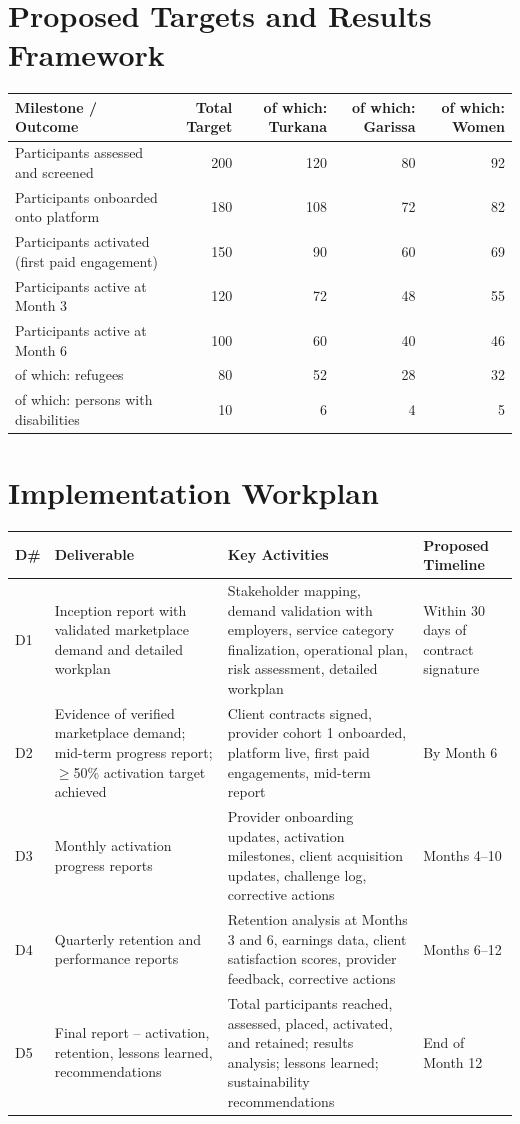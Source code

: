 \documentclass[11pt,a4paper]{article}
\begin{document}
\section{Proposed Targets and Results Framework}
\begin{longtable}{@{}lrrrr@{}}
\textbf{Milestone / Outcome} & \textbf{Total Target} & \textbf{of which: Turkana} & \textbf{of which: Garissa} & \textbf{of which: Women} \\
\hline
Participants assessed and screened & 200 & 120 & 80 & 92 \\
Participants onboarded onto platform & 180 & 108 & 72 & 82 \\
Participants activated (first paid engagement) & 150 & 90 & 60 & 69 \\
Participants active at Month 3 & 120 & 72 & 48 & 55 \\
Participants active at Month 6 & 100 & 60 & 40 & 46 \\
\hline
of which: refugees & 80 & 52 & 28 & 32 \\
of which: persons with disabilities & 10 & 6 & 4 & 5 \\
\end{longtable}

\section{Implementation Workplan}
\begin{longtable}{@{}llll@{}}
\textbf{D\#} & \textbf{Deliverable} & \textbf{Key Activities} & \textbf{Proposed Timeline} \\
\hline
D1 & Inception report with validated marketplace demand and detailed workplan & Stakeholder mapping, demand validation with employers, service category finalization, operational plan, risk assessment, detailed workplan & Within 30 days of contract signature \\
\hline
D2 & Evidence of verified marketplace demand; mid-term progress report; $\geq$50\% activation target achieved & Client contracts signed, provider cohort 1 onboarded, platform live, first paid engagements, mid-term report & By Month 6 \\
\hline
D3 & Monthly activation progress reports & Provider onboarding updates, activation milestones, client acquisition updates, challenge log, corrective actions & Months 4--10 \\
\hline
D4 & Quarterly retention and performance reports & Retention analysis at Months 3 and 6, earnings data, client satisfaction scores, provider feedback, corrective actions & Months 6--12 \\
\hline
D5 & Final report -- activation, retention, lessons learned, recommendations & Total participants reached, assessed, placed, activated, and retained; results analysis; lessons learned; sustainability recommendations & End of Month 12 \\
\end{longtable}
\end{document}
